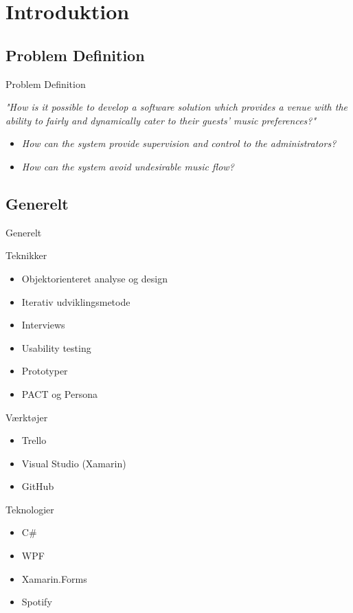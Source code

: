 \section{Introduktion}

\subsection{Problem Definition}
\begin{frame}{Problem Definition}
	\begin{center}
		\textit{"How is it possible to develop a software solution which provides a venue with the ability to fairly and dynamically cater to their guests' music preferences?"}
	\end{center}
	\begin{itemize}
		\item \textit{How can the system provide supervision and control to the administrators?}
		\item \textit{How can the system avoid undesirable music flow?}
	\end{itemize}
\end{frame}

\subsection{Generelt}
\begin{frame}{Generelt}
	\begin{multicols}{2}
		Teknikker
		\begin{itemize}
			\item Objektorienteret analyse og design
			\item Iterativ udviklingsmetode
			\item Interviews
			\item Usability testing
			\item Prototyper
			\item PACT og Persona\newline
		\end{itemize}
		
		Værktøjer
		\begin{itemize}
			\item Trello
			\item Visual Studio (Xamarin)
			\item GitHub
		\end{itemize}
		
		\columnbreak
		
		Teknologier
		\begin{itemize}
			\item C\#
			\item WPF
			\item Xamarin.Forms
			\item Spotify
		\end{itemize}
	\end{multicols}
\end{frame}

